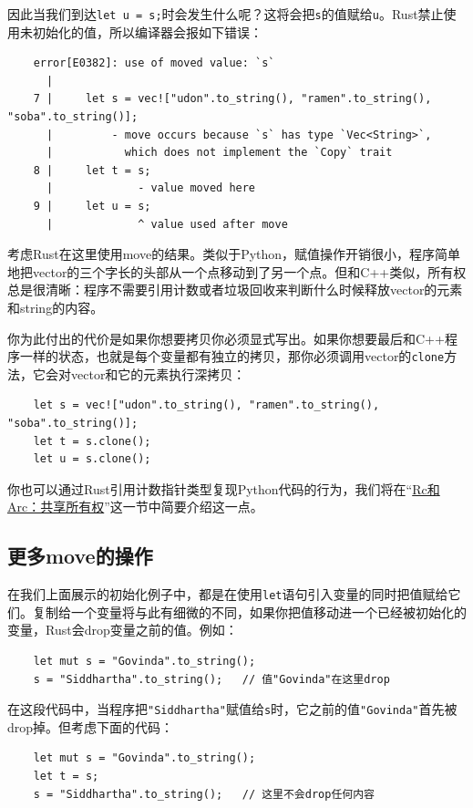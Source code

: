 因此当我们到达\texttt{let u = s;}时会发生什么呢？这将会把\texttt{s}的值赋给\texttt{u}。Rust禁止使用未初始化的值，所以编译器会报如下错误：
\begin{verbatim}
    error[E0382]: use of moved value: `s`
      |
    7 |     let s = vec!["udon".to_string(), "ramen".to_string(), "soba".to_string()];
      |         - move occurs because `s` has type `Vec<String>`,
      |           which does not implement the `Copy` trait
    8 |     let t = s;
      |             - value moved here
    9 |     let u = s;
      |             ^ value used after move
\end{verbatim}

考虑Rust在这里使用move的结果。类似于Python，赋值操作开销很小，程序简单地把vector的三个字长的头部从一个点移动到了另一个点。但和C++类似，所有权总是很清晰：程序不需要引用计数或者垃圾回收来判断什么时候释放vector的元素和string的内容。

你为此付出的代价是如果你想要拷贝你必须显式写出。如果你想要最后和C++程序一样的状态，也就是每个变量都有独立的拷贝，那你必须调用vector的\texttt{clone}方法，它会对vector和它的元素执行深拷贝：
\begin{verbatim}
    let s = vec!["udon".to_string(), "ramen".to_string(), "soba".to_string()];
    let t = s.clone();
    let u = s.clone();
\end{verbatim}

你也可以通过Rust引用计数指针类型复现Python代码的行为，我们将在“\hyperref[rc]{Rc和Arc：共享所有权}”这一节中简要介绍这一点。

\subsection{更多move的操作}

在我们上面展示的初始化例子中，都是在使用\texttt{let}语句引入变量的同时把值赋给它们。复制给一个变量将与此有细微的不同，如果你把值移动进一个已经被初始化的变量，Rust会drop变量之前的值。例如：
\begin{verbatim}
    let mut s = "Govinda".to_string();
    s = "Siddhartha".to_string();   // 值"Govinda"在这里drop
\end{verbatim}

在这段代码中，当程序把\texttt{"Siddhartha"}赋值给\texttt{s}时，它之前的值\texttt{"Govinda"}首先被drop掉。但考虑下面的代码：
\begin{verbatim}
    let mut s = "Govinda".to_string();
    let t = s;
    s = "Siddhartha".to_string();   // 这里不会drop任何内容
\end{verbatim}

